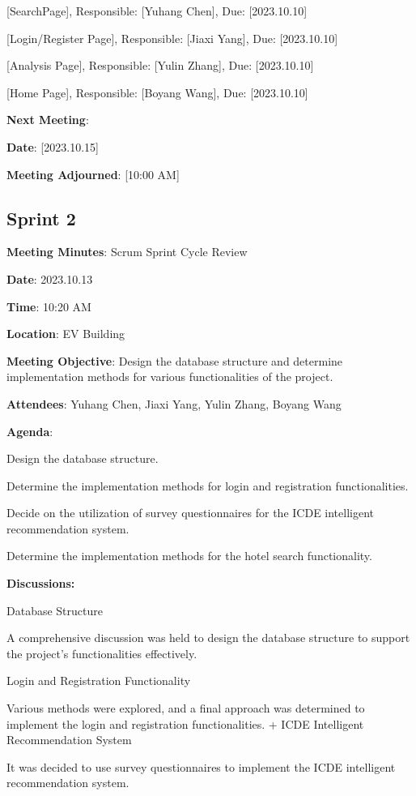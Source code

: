 \documentclass[conference]{IEEEtran}
\begin{document}
[SearchPage], Responsible: [Yuhang Chen], Due: [2023.10.10]

[Login/Register Page], Responsible: [Jiaxi Yang], Due: [2023.10.10]

[Analysis Page], Responsible: [Yulin Zhang], Due: [2023.10.10]

[Home Page], Responsible: [Boyang Wang], Due: [2023.10.10]

\textbf{Next Meeting}:

\textbf{Date}: [2023.10.15]

\textbf{Meeting Adjourned}: [10:00 AM]

\subsection*{Sprint 2}

\textbf{Meeting Minutes}: Scrum Sprint Cycle Review

\textbf{Date}: 2023.10.13

\textbf{Time}: 10:20 AM

\textbf{Location}: EV Building

\textbf{Meeting Objective}: Design the database structure and determine implementation methods for various functionalities of the project.

\textbf{Attendees}: Yuhang Chen, Jiaxi Yang, Yulin Zhang, Boyang Wang

\textbf{Agenda}:

Design the database structure.

Determine the implementation methods for login and registration functionalities.

Decide on the utilization of survey questionnaires for the ICDE intelligent recommendation system.

Determine the implementation methods for the hotel search functionality.

\textbf{Discussions:}

Database Structure

A comprehensive discussion was held to design the database structure to support the project's functionalities effectively.

Login and Registration Functionality

Various methods were explored, and a final approach was determined to implement the login and registration functionalities.
+
ICDE Intelligent Recommendation System

It was decided to use survey questionnaires to implement the ICDE intelligent recommendation system.
\end{document}
